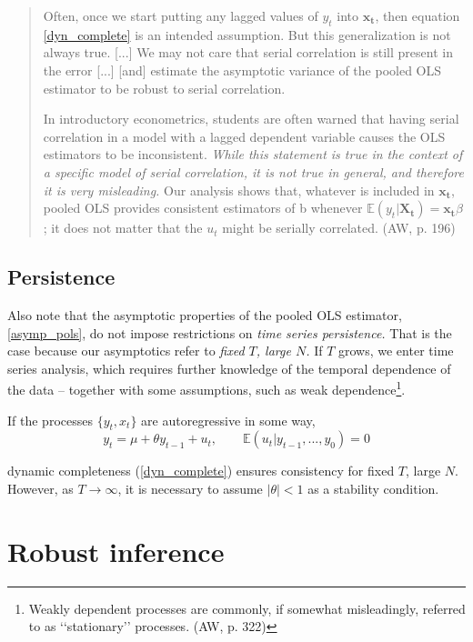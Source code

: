 \documentclass[11pt, a4paper]{report}
\theoremstyle{plain}
\theoremstyle{plain}
\theoremstyle{remark}
\begin{document}
\begin{quote}
    Often, once we start putting any lagged values of $y_t$ into $\mathbf{x_t}$, then equation \ref{dyn_complete} is an intended assumption. But this generalization is not always true. [...] We
    may not care that serial correlation is still present in the error [...] [and] estimate the asymptotic variance of the pooled OLS estimator
    to be robust to serial correlation.

    In introductory econometrics, students are often warned that having serial correlation in a model with a lagged dependent variable causes the OLS estimators to be
    inconsistent. \textit{While this statement is true in the context of a specific model of serial
    correlation, it is not true in general, and therefore it is very misleading.} Our
    analysis shows that, whatever is included in $\mathbf{x_t}$, pooled OLS provides consistent estimators of b whenever $\mathbb{E}(y_t | \mathbf{X_t}) = \mathbf{x_t} \beta$; it does not matter that the $u_t$ might be
    serially correlated. (AW, p. 196)
\end{quote}

\subsection{Persistence}

Also note that the asymptotic properties of the pooled OLS estimator, \ref{asymp_pols}, do not impose restrictions on \textit{time series persistence.} That is the case because our asymptotics refer to \textit{fixed $T$, large $N$.} If $T$ grows, we enter time series analysis, which requires further knowledge of the temporal dependence of the data -- together with some assumptions, such as weak dependence\footnote{Weakly dependent processes are commonly, if somewhat misleadingly,
referred to as ‘‘stationary’’ processes. (AW, p. 322)}. 

If the processes $\{y_t, x_t\}$ are autoregressive in some way,
\begin{equation}
    y_t = \mu + \theta y_{t-1} + u_t, \hspace{2em} \mathbb{E}(u_t | y_{t-1},..., y_0) = 0
\end{equation}

dynamic completeness (\ref{dyn_complete}) ensures consistency for fixed $T$, large $N$. However, as $T \to \infty$, it is necessary to assume $|\theta| < 1$ as a stability condition. 

\section{Robust inference}
\end{document}
